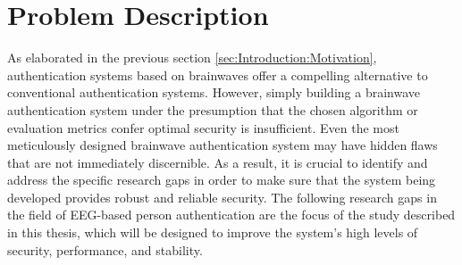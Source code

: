 \section{Problem Description}
\label{sec:Introduction:Problem Description}
As elaborated in the previous section \ref{sec:Introduction:Motivation}, authentication systems based on brainwaves offer a compelling alternative to conventional authentication systems. However, simply building a brainwave authentication system under the presumption that the chosen algorithm or evaluation metrics confer optimal security is insufficient. Even the most meticulously designed brainwave authentication system may have hidden flaws that are not immediately discernible. As a result, it is crucial to identify and address the specific research gaps in order to make sure that the system being developed provides robust and reliable security. The following research gaps in the field of EEG-based person authentication are the focus of the study described in this thesis, which will be designed to improve the system's high levels of security, performance, and stability.


